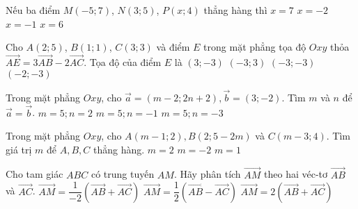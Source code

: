\begin{ex}%
	Nếu ba điểm $M(-5; 7)$, $N(3; 5)$, $P(x; 4)$ thẳng hàng thì
	\choice
	{\True $x = 7$}
	{$x = -2$}
	{$x = -1$}
	{$x = 6$}
\end{ex}

\begin{ex}%
	Cho $A(2; 5)$, $B(1; 1)$, $C(3; 3)$ và điểm $E$ trong mặt phẳng tọa độ $Oxy$ thỏa $\vec{AE} = 3\vec{AB} - 2\vec{AC}$. Tọa độ của điểm $E$ là
	\choice
	{$(3; -3)$}
	{$(-3; 3)$}
	{\True $(-3; -3)$}
	{$(-2; -3)$}
\end{ex}

\begin{ex}%
	Trong mặt phẳng $Oxy$, cho $\vec{a} = (m - 2; 2n + 2), \vec{b} = (3; -2)$. Tìm $m$ và $n$ để $\vec{a} = \vec{b}$.
	{$m = 5; n = 2$}
	{$m =5; n = -1$}
	{$m = 5; n = -3$}
\end{ex}

\begin{ex}%
	Trong mặt phẳng $Oxy$, cho $A(m - 1; 2), B(2; 5 - 2m)$ và $C(m - 3; 4)$. Tìm giá trị $m$ để $A, B, C$ thẳng hàng.
	{\True $m = 2$}
	{$m = -2$}
	{$m = 1$}
\end{ex}


\begin{ex}%
	Cho tam giác $ABC$ có trung tuyến $AM$. Hãy phân tích $\vec{AM}$ theo hai véc-tơ $\vec{AB}$ và $\vec{AC}$.
	{$\vec{AM} = \dfrac{1}{-2}\left(\vec{AB} + \vec{AC}\right)$}
	{$\vec{AM} = \dfrac{1}{2}\left(\vec{AB} - \vec{AC}\right)$}
	{$\vec{AM} = 2\left(\vec{AB} + \vec{AC}\right)$}
\end{ex}

